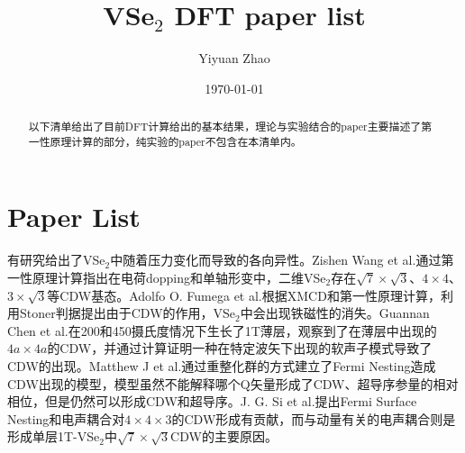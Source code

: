 \documentclass[reprint, aps, prb, showkeys]{revtex4-2}
\begin{document}
\title{VSe$_2$ DFT paper list}

\author{Yiyuan Zhao}
\date{\today}

\begin{abstract}
以下清单给出了目前DFT计算给出的基本结果，理论与实验结合的paper主要描述了第一性原理计算的部分，纯实验的paper不包含在本清单内。
\end{abstract}


\maketitle

\section{Paper List}

有研究\cite{doi:10.1063/1.5092846}给出了VSe$_2$中随着压力变化而导致的各向异性。Zishen Wang et al.\cite{wang2020controllable}通过第一性原理计算指出在电荷dopping和单轴形变中，二维VSe$_2$存在$\sqrt{7} \times \sqrt{3}$、$4 \times 4$、$3 \times \sqrt{3}$等CDW基态。Adolfo O. Fumega et al.\cite{doi:10.1021/acs.jpcc.9b08868}根据XMCD和第一性原理计算，利用Stoner判据提出由于CDW的作用，VSe$_2$中会出现铁磁性的消失。Guannan Chen et al.\cite{PhysRevB.102.115149}在200和450摄氏度情况下生长了1T薄层，观察到了在薄层中出现的$4a \times 4a$的CDW，并通过计算证明一种在特定波矢下出现的软声子模式导致了CDW的出现。Matthew J et al.\cite{trott2020fermi}通过重整化群的方式建立了Fermi Nesting造成CDW出现的模型，模型虽然不能解释哪个Q矢量形成了CDW、超导序参量的相对相位，但是仍然可以形成CDW和超导序。J. G. Si et al.\cite{PhysRevB.101.235405}提出Fermi Surface Nesting和电声耦合对$4 \times 4 \times 3$的CDW形成有贡献，而与动量有关的电声耦合则是形成单层1T-VSe$_2$中$\sqrt{7} \times \sqrt{3}$CDW的主要原因。
\end{document}
